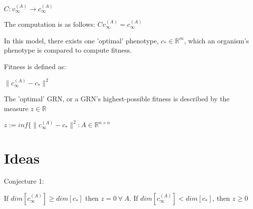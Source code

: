 \documentclass[a4paper,12pt]{article}
\begin{document}
$C: v_{\infty}^{(A)} \rightarrow c^{(A)}_{\infty}$

The computation is as follows: $Cv_{\infty}^{(A)} = c_{\infty}^{(A)}$

In this model, there exists one 'optimal' phenotype, $c_{*} \in \mathbb{R}^{m}$, which an organism's phenotype is compared to compute fitness. 

Fitness is defined as: 

$\lVert c_{\infty}^{(A)} - c_{*} \rVert^{2}$

The 'optimal' GRN, or a GRN's highest-possible fitness is described by the measure $z \in \mathbb{R}$

$ z := inf\{\lVert c_{\infty}^{(A)} - c_{*} \rVert^{2}: A \in \mathbb{R}^{n \times n}$

\section{Ideas}

Conjecture 1:

 If $dim{[c_{\infty}^{(A)}]} \geq dim{[c_{*}]}$ then $z = 0\ \forall \ A$. If $dim{[c_{\infty}^{(A)}]} <  dim{[c_{*}]}$, then $z \geq 0$
\end{document}
